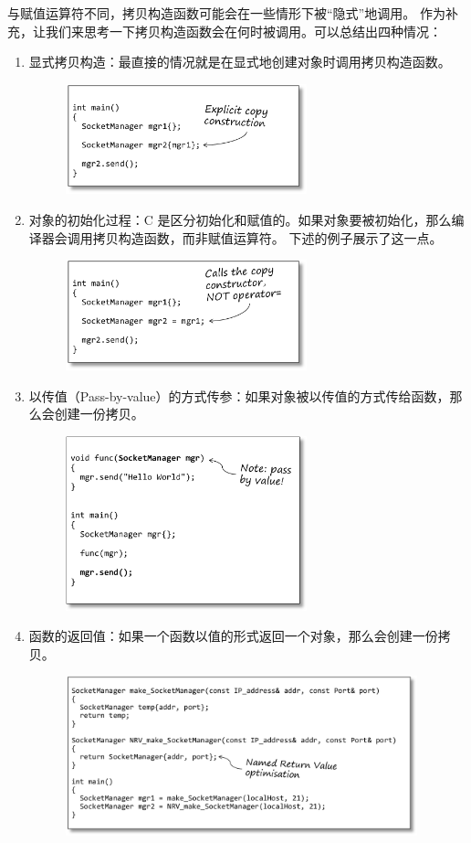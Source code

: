 \documentclass[12pt]{article}
\newcommand{\CC}{C\nolinebreak\hspace{-.05em}\raisebox{.4ex}{\tiny\bf +}%
\nolinebreak\hspace{-.10em}\raisebox{.4ex}{\tiny\bf +}}
\begin{document}
\indent{}与赋值运算符不同，拷贝构造函数可能会在一些情形下被“隐式”地调用。
作为补充，让我们来思考一下拷贝构造函数会在何时被调用。可以总结出四种情况：
\begin{enumerate}
\item 显式拷贝构造：最直接的情况就是在显式地创建对象时调用拷贝构造函数。
\begin{figure}[!h]
\centering
\includegraphics[width=7cm]{./imgs/image.UV9GS0.png}
\end{figure}
\item 对象的初始化过程：{\CC} 是区分初始化和赋值的。如果对象要被初始化，那么编译器会调用拷贝构造函数，而非赋值运算符。%
                        下述的例子展示了这一点。
\begin{figure}[!h]
\centering
\includegraphics[width=7cm]{./imgs/image.X51GS0.png}
\end{figure}
\item 以传值（Pass-by-value）的方式传参：如果对象被以传值的方式传给函数，那么会创建一份拷贝。
\begin{figure}[!h]
\centering
\includegraphics[width=7cm]{./imgs/image.ANABS0.png}
\end{figure}
\item 函数的返回值：如果一个函数以值的形式返回一个对象，那么会创建一份拷贝。
\begin{figure}[!h]
\centering
\includegraphics[width=10.2cm]{./imgs/image.TX9KS0.png}
\end{figure}
\end{enumerate}
\end{document}
